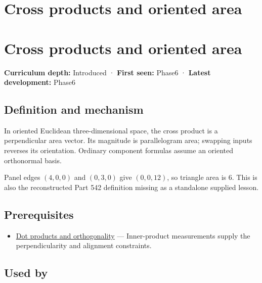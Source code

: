 \hypertarget{appendix-2391db8052b1}{}
\section*{Cross products and oriented area}
\section{Cross products and oriented area}\label{cross-products-and-oriented-area}

\textbf{Curriculum depth:} Introduced · \textbf{First seen:} Phase6 · \textbf{Latest development:} Phase6

\subsection{Definition and mechanism}\label{definition-and-mechanism}

In oriented Euclidean three-dimensional space, the cross product is a perpendicular area vector. Its magnitude is parallelogram area; swapping inputs reverses its orientation. Ordinary component formulas assume an oriented orthonormal basis.

Panel edges \((4,0,0)\) and \((0,3,0)\) give \((0,0,12)\), so triangle area is \(6\). This is also the reconstructed Part 542 definition missing as a standalone supplied lesson.

\subsection{Prerequisites}\label{prerequisites}

\begin{itemize}
\tightlist
\item
  \hyperref[appendix-8bc4e8fc547c]{Dot products and orthogonality} --- Inner-product measurements supply the perpendicularity and alignment constraints.
\end{itemize}

\subsection{Used by}\label{used-by}

